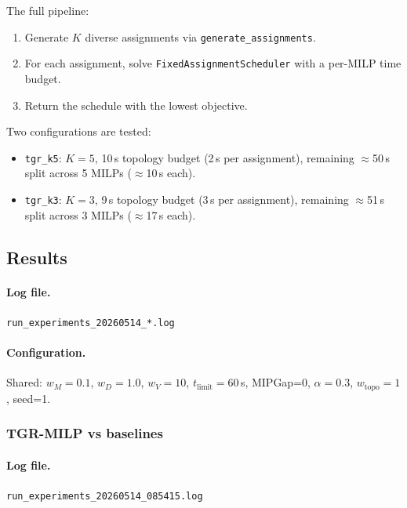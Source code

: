 The full pipeline:
\begin{enumerate}[noitemsep]
    \item Generate $K$ diverse assignments via \texttt{generate\_assignments}.
    \item For each assignment, solve \texttt{FixedAssignmentScheduler} with
          a per-MILP time budget.
    \item Return the schedule with the lowest objective.
\end{enumerate}

Two configurations are tested:
\begin{itemize}[noitemsep]
    \item \texttt{tgr\_k5}: $K=5$, 10\,s topology budget (2\,s per assignment),
          remaining $\approx$50\,s split across 5 MILPs ($\approx$10\,s each).
    \item \texttt{tgr\_k3}: $K=3$, 9\,s topology budget (3\,s per assignment),
          remaining $\approx$51\,s split across 3 MILPs ($\approx$17\,s each).
\end{itemize}

\subsection{Results}
\label{exp:exp02-results}

\paragraph{Log file.}
\texttt{run\_experiments\_20260514\_*.log}

\paragraph{Configuration.}
Shared: $w_M=0.1$, $w_D=1.0$, $w_V=10$, $t_{\text{limit}}=60$\,s,
MIPGap=0, $\alpha=0.3$, $w_{\text{topo}}=1$, seed=1.

\subsubsection{TGR-MILP vs baselines}

\paragraph{Log file.} \texttt{run\_experiments\_20260514\_085415.log}

